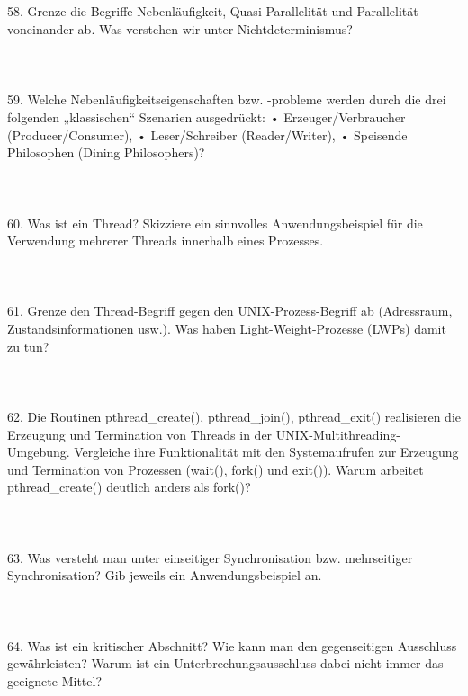 \documentclass{article}
\begin{document}
\\
\\
\\
\\
58. Grenze die Begriffe Nebenläufigkeit, Quasi-Parallelität und Parallelität voneinander ab.
Was verstehen wir unter Nichtdeterminismus?
\\
\\
\\
\\
59. Welche Nebenläufigkeitseigenschaften bzw. -probleme werden durch die drei folgenden
„klassischen“ Szenarien ausgedrückt:
• Erzeuger/Verbraucher (Producer/Consumer),
• Leser/Schreiber (Reader/Writer),
• Speisende Philosophen (Dining Philosophers)?
\\
\\
\\
\\
60. Was ist ein Thread? Skizziere ein sinnvolles Anwendungsbeispiel für die Verwendung
mehrerer Threads innerhalb eines Prozesses.
\\
\\
\\
\\
61. Grenze den Thread-Begriff gegen den UNIX-Prozess-Begriff ab (Adressraum, Zustandsinformationen usw.). Was haben Light-Weight-Prozesse (LWPs) damit zu tun?
\\
\\
\\
\\
62. Die Routinen pthread_create(), pthread_join(), pthread_exit() realisieren die Erzeugung und Termination von Threads in der UNIX-Multithreading-Umgebung. Vergleiche
ihre Funktionalität mit den Systemaufrufen zur Erzeugung und Termination von Prozessen
(wait(), fork() und exit()). Warum arbeitet pthread_create() deutlich anders als
fork()?
\\
\\
\\
\\
63. Was versteht man unter einseitiger Synchronisation bzw. mehrseitiger Synchronisation?
Gib jeweils ein Anwendungsbeispiel an.
\\
\\
\\
\\
64. Was ist ein kritischer Abschnitt? Wie kann man den gegenseitigen Ausschluss gewährleisten?
Warum ist ein Unterbrechungsausschluss dabei nicht immer das geeignete Mittel?
\\
\\
\end{document}
